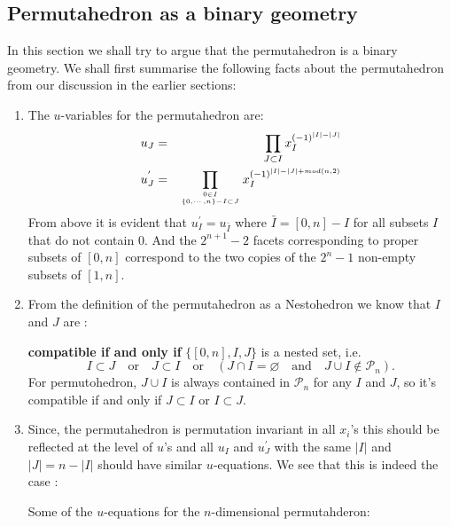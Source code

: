 \documentclass[hidelinks,12pt]{article}
\newcommand{\bea}[1]{\begin{eqnarray}\label{#1} }
\newcommand{\eea}{\end{eqnarray}}
\def\bea{\begin{eqnarray}}
\def\eea{\end{eqnarray}}
\begin{document}
\subsection{Permutahedron as a binary geometry}
In this section we shall try to argue that the permutahedron is a binary geometry. We shall first summarise the following facts about the permutahedron from our discussion in the earlier sections:
\begin{enumerate}
\item The $u$-variables for the permutahedron are: 
\bea
u_J &=& ~~\prod_{J \subset I} x_I^{(-1)^{|I|-|J|}} \nonumber \\
u^{'}_J &=& \prod_{{0 \in I}\atop{ \{0,\cdots,n\} - I \subset J}} x_I^{(-1)^{|I|-|J|+mod(n, 2)}} \nonumber
\eea
From above it is evident that $u^{'}_{I} = u_{\bar{I}} $ where $\bar{I}=[0,n]-I$ for all subsets $I$ that do not contain $0$. 
And the $2^{n+1}-2$ facets corresponding to proper subsets of $[0,n]$ correspond to the two copies of the $2^{n}-1$ non-empty subsets of $[1,n]$.

\item From the definition of the permutahedron as a Nestohedron we know that $I$ and $J$ are :



{\bf compatible if and only if} $\{[0,n],I,J\}$ is a nested set, i.e.
\[
I\subset J\quad \text{or}\quad J\subset I\quad \text{or}\quad (J\cap I=\varnothing \quad \text{and}\quad J\cup I\not\in \mathscr P_n).
\]
For permutohedron, $J\cup I$ is always contained in $\mathscr P_n$ for any $I$ and $J$, so it's compatible if and only if $J\subset I$ or $I\subset J$.


\item  Since, the permutahedron is permutation invariant in all $x_i$'s this should be reflected at the level of $u$'s and all $u_I$ and $u^{'}_{J}$ with the same $|I|$ and $|J| =n-|I|$ should have similar $u$-equations. We see that this is indeed the case :

Some of the $u$-equations for the $n$-dimensional permutahderon:\\


\end{enumerate}
\end{document}

